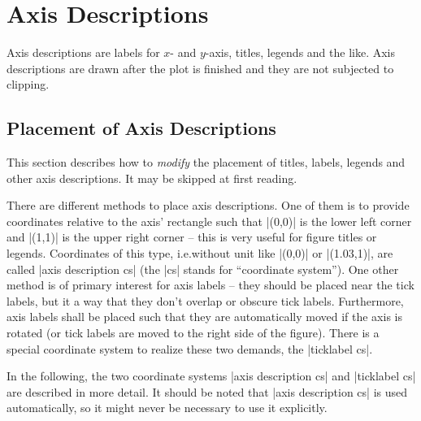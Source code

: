 
\section{Axis Descriptions}

Axis descriptions are labels for $x$- and $y$-axis, titles, legends and the
like. Axis descriptions are drawn after the plot is finished and they are not
subjected to clipping.


\subsection{Placement of Axis Descriptions}

This section describes how to \emph{modify} the placement of titles, labels,
legends and other axis descriptions. It may be skipped at first reading.

There are different methods to place axis descriptions. One of them is to
provide coordinates relative to the axis' rectangle such that |(0,0)| is the
lower left corner and |(1,1)| is the upper right corner -- this is very useful
for figure titles or legends. Coordinates of this type, i.e.\@ without unit
like |(0,0)| or |(1.03,1)|, are called |axis description cs| (the |cs| stands
for ``coordinate system''). One other method is of primary interest for axis
labels -- they should be placed near the tick labels, but it a way that they
don't overlap or obscure tick labels. Furthermore, axis labels shall be placed
such that they are automatically moved if the axis is rotated (or tick labels
are moved to the right side of the figure). There is a special coordinate
system to realize these two demands, the |ticklabel cs|.

In the following, the two coordinate systems |axis description cs| and
|ticklabel cs| are described in more detail. It should be noted that
|axis description cs| is used automatically, so it might never be necessary to
use it explicitly.


